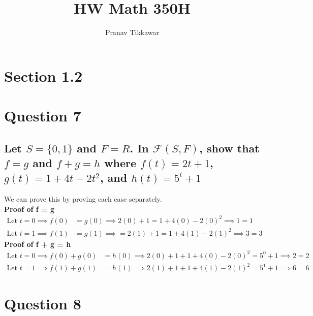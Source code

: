 \documentclass{article}
\author{Pranav Tikkawar}
\title{HW Math 350H}
\begin{document}
\maketitle
\section*{Section 1.2}
\section*{Question 7}
\subsection*{Let $S = \{ 0,1 \}$ and $F = R$. In $\mathcal{F}(S,F)$, show that $f = g$ and $f +g =h$ where $f(t) = 2t + 1$, $g(t) = 1 + 4t - 2t^2$, and $h(t) = 5^t + 1$}
We can prove this by proving each case separately.\\
\textbf{Proof of f = g}
\begin{align*}
    \text{Let } t = 0 \implies f(0) &= g(0) \implies 2(0)+1 = 1 + 4(0) - 2(0)^2 \implies 1 = 1\\
    \text{Let } t = 1 \implies f(1) &= g(1) \implies  = 2(1)+1 = 1 + 4(1) - 2(1)^2 \implies 3 = 3
\end{align*}
\textbf{Proof of f + g = h}
\begin{align*}
    \text{Let } t= 0 \implies f(0) + g(0) &= h(0) \implies 2(0)+1 + 1 + 4(0) - 2(0)^2 = 5^0 + 1 \implies 2 = 2\\
    \text{Let } t= 1 \implies f(1) + g(1) &= h(1) \implies 2(1)+1 + 1 + 4(1) - 2(1)^2 = 5^1 + 1 \implies 6 = 6
\end{align*}
\section*{Question 8}
\end{document}
